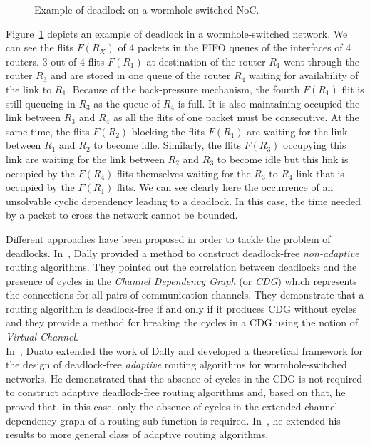 \documentclass[main.tex]{subfiles}
\begin{document}
\begin{example}
\begin{figure}
    \centering
    \scalebox{0.5}{}
    \caption{Example of deadlock on a wormhole-switched NoC.}
    \label{fig_stateOfTheArt_NoCdeadlock}
\end{figure}
    Figure~\ref{fig_stateOfTheArt_NoCdeadlock} depicts an example of deadlock in a wormhole-switched network. We can see the flits $F(R_X)$ of 4 packets in the FIFO queues of the interfaces of 4 routers. 3 out of 4 flits $F(R_1)$ at destination of the router $R_1$ went through the router $R_3$ and are stored in one queue of the router $R_4$ waiting for availability of the link to $R_1$. Because of the back-pressure mechanism, the fourth $F(R_1)$ flit is still queueing in $R_3$ as the queue of $R_4$ is full. It is also maintaining occupied the link between $R_3$ and $R_4$ as all the flits of one packet must be consecutive. At the same time, the flits $F(R_2)$ blocking the flits $F(R_1)$ are waiting for the link between $R_1$ and $R_2$ to become idle. Similarly, the flits $F(R_3)$ occupying this link are waiting for the link between $R_2$ and $R_3$ to become idle but this link is occupied by the $F(R_4)$ flits themselves waiting for the $R_3$ to $R_4$ link that is occupied by the $F(R_1)$ flits. We can see clearly here the occurrence of an unsolvable cyclic dependency leading to a deadlock. In this case, the time needed by a packet to cross the network cannot be bounded. 
\end{example}

Different approaches have been proposed in order to tackle the problem of deadlocks. In~\cite{Dally1987}, Dally \etal provided a method to construct deadlock-free \emph{non-adaptive} routing algorithms. They pointed out the correlation between deadlocks and the presence of cycles in the \emph{Channel Dependency Graph} (or \emph{CDG}) which represents the connections for all pairs of communication channels. They demonstrate that a routing algorithm is deadlock-free if and only if it produces CDG without cycles and they provide a method for breaking the cycles in a CDG using the notion of \emph{Virtual Channel}. \\

In~\cite{Duato1993}, Duato extended the work of Dally \etal and developed a theoretical framework for the design of deadlock-free \emph{adaptive} routing algorithms for wormhole-switched networks. He demonstrated that the absence of cycles in the CDG is not required to construct adaptive deadlock-free routing algorithms and, based on that, he proved that, in this case, only the absence of cycles in the extended channel dependency graph of a routing sub-function is required. In~\cite{Duato1995}, he extended his results to more general class of adaptive routing algorithms. \\
\end{document}
